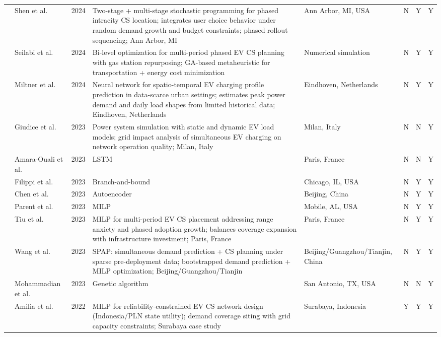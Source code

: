 \documentclass[letterpaper, 12pt, oneside, doublespacing]{Thesis}
\begin{document}
\begin{longtable}{L{0.9cm} L{1.8cm} L{0.7cm} L{2.5cm} L{2.1cm} L{0.7cm} L{0.7cm} L{0.7cm}}
\cite{sequential_charging_2024} & Shen et al. & 2024 & Two-stage + multi-stage stochastic programming for phased intracity CS location; integrates user choice behavior under random demand growth and budget constraints; phased rollout sequencing; Ann Arbor, MI & Ann Arbor, MI, USA & N & Y & Y \\
\cite{sustainable_planning_2024} & Seilabi et al. & 2024 & Bi-level optimization for multi-period phased EV CS planning with gas station repurposing; GA-based metaheuristic for transportation + energy cost minimization & Numerical simulation & N & Y & Y \\
\cite{towards_using_2024} & Miltner et al. & 2024 & Neural network for spatio-temporal EV charging profile prediction in data-scarce urban settings; estimates peak power demand and daily load shapes from limited historical data; Eindhoven, Netherlands & Eindhoven, Netherlands & N & Y & Y \\
\cite{definition_of_2023} & Giudice et al. & 2023 & Power system simulation with static and dynamic EV load models; grid impact analysis of simultaneous EV charging on network operation quality; Milan, Italy & Milan, Italy & N & N & Y \\
\cite{forecasting_electric_2023} & Amara-Ouali et al. & 2023 & LSTM & Paris, France & N & N & Y \\
\cite{incorporating_time-dependent_2023} & Filippi et al. & 2023 & Branch-and-bound & Chicago, IL, USA & N & Y & Y \\
\cite{m-bev_masked_2023} & Chen et al. & 2023 & Autoencoder & Beijing, China & N & Y & Y \\
\cite{maximum_flow-based_2023} & Parent et al. & 2023 & MILP & Mobile, AL, USA & N & Y & Y \\
\cite{on_the_2023} & Tiu et al. & 2023 & MILP for multi-period EV CS placement addressing range anxiety and phased adoption growth; balances coverage expansion with infrastructure investment; Paris, France & Paris, France & N & Y & Y \\
\cite{spap_simultaneous_2023} & Wang et al. & 2023 & SPAP: simultaneous demand prediction + CS planning under sparse pre-deployment data; bootstrapped demand prediction + MILP optimization; Beijing/Guangzhou/Tianjin & Beijing{\slash}Guangzhou{\slash}Tianjin, China & N & Y & Y \\
\cite{spatial_arbitrage_2023} & Mohammadian et al. & 2023 & Genetic algorithm & San Antonio, TX, USA & N & N & Y \\
\cite{designing_an_2022} & Amilia et al. & 2022 & MILP for reliability-constrained EV CS network design (Indonesia/PLN state utility); demand coverage siting with grid capacity constraints; Surabaya case study & Surabaya, Indonesia & Y & Y & Y \\

\end{longtable}
\end{document}
